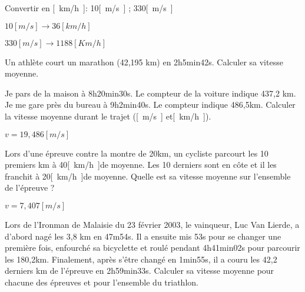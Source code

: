 \begin{exercise}
    Convertir en \unit{[km/h]}: 10\unit{[m/s]} ; 330\unit{[m/s]}
\end{exercise}
\begin{solution}
    \item \(10[m/s] \rightarrow 36[km/h]\)
    \item \(330[m/s] \rightarrow 1188[Km/h]\)
\end{solution}


\begin{exercise}
    Un athlète court un marathon (42,195 km) en 2h5min42s. Calculer sa vitesse moyenne.
\end{exercise}
\begin{solution}
\end{solution}


\begin{exercise}
    Je pars de la maison à 8h20min30s. Le compteur de la voiture indique 437,2 km.
    Je me gare près du bureau à 9h2min40s. Le compteur indique 486,5km.
    Calculer la vitesse moyenne durant le trajet (\unit{[m/s]} et\unit{[km/h]}).
\end{exercise}
\begin{solution}
    \(v=19,486\unit{[m/s]}\)
\end{solution}


\begin{exercise}
    Lors d'une épreuve contre la montre de 20km, un cycliste parcourt les 10 premiers km à 40\unit{[km/h]}de moyenne. Les 10 derniers sont en côte et il les franchit à 20\unit{[km/h]}de moyenne. Quelle est sa vitesse moyenne sur l'ensemble de l'épreuve ?
\end{exercise}
\begin{solution}
    \(v=7,407\unit{[m/s]}\)
\end{solution}


\begin{exercise}
    Lors de l'Ironman de Malaisie du 23 février 2003, le vainqueur, Luc Van Lierde, a d'abord nagé les 3,8 km en 47m54s. Il a ensuite mis 53s pour se changer une première fois, enfourché sa bicyclette et roulé pendant 4h41min02s pour parcourir les 180,2km. Finalement, après s'être changé en 1min55s, il a couru les 42,2 derniers km de l'épreuve en 2h59min33s. Calculer sa vitesse moyenne pour chacune des épreuves et pour l'ensemble du triathlon.
\end{exercise}
\begin{solution}
\end{solution}


